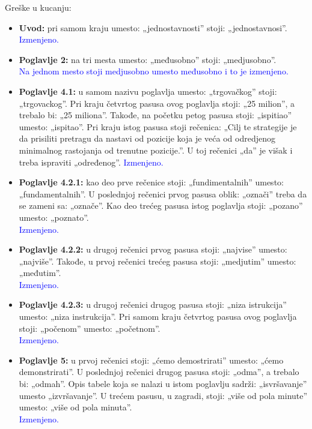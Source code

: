 \documentclass[a4paper]{report}
\newcommand{\odgovor}[1]{\textcolor{blue}{#1}}
\begin{document}
Greške u kucanju:
\begin{itemize}
 \item \textbf{Uvod:} pri samom kraju umesto: „jednostavnosti” stoji: „jednostavnosi”.
 \odgovor{Izmenjeno.\\}
 
 \item \textbf{Poglavlje 2:} na tri mesta umesto: „međusobno” stoji: „medjusobno”.\\
 \odgovor{Na jednom mesto stoji medjusobno umesto međusobno i to je izmenjeno.\\}
 
 \item \textbf{Poglavlje 4.1:} u samom nazivu poglavlja umesto: „trgovačkog” stoji: „trgovackog”. Pri kraju četvrtog pasusa ovog poglavlja stoji: „25 milion”, a trebalo bi: „25 miliona”. Takođe, na početku petog pasusa stoji: „ispitiao” umesto: „ispitao”. Pri kraju istog pasusa stoji rečenica: „Cilj te strategije je da prisiliti pretragu da nastavi od pozicije koja je veća od odredjenog minimalnog rastojanja od trenutne pozicije.”. U toj rečenici „da” je višak i treba ispraviti „određenog”.
 \odgovor{Izmenjeno.\\}
 \item \textbf{Poglavlje 4.2.1:} kao deo prve rečenice stoji: „fundimentalnih” umesto: „fundamentalnih”. U poslednjoj rečenici prvog pasusa oblik: „označi” treba da se zameni sa: „označe”. Kao deo trećeg pasusa istog poglavlja stoji: „pozano” umesto: „poznato”.\\
\odgovor{Izmenjeno.\\}
 
 \item \textbf{Poglavlje 4.2.2:} u drugoj rečenici prvog pasusa stoji: „najvise” umesto: „najviše”. Takođe, u prvoj rečenici trećeg pasusa stoji: „medjutim” umesto: „međutim”.\\
\odgovor{Izmenjeno.\\}
 
 \item \textbf{Poglavlje 4.2.3:} u drugoj rečenici drugog pasusa stoji: „niza istrukcija” umesto: „niza instrukcija”. Pri samom kraju četvrtog pasusa ovog poglavlja stoji: „počenom” umesto: „početnom”.\\
\odgovor{Izmenjeno.\\}
 
 \item \textbf{Poglavlje 5:} u prvoj rečenici stoji: „ćemo demostrirati” umesto: „ćemo demonstrirati”. U poslednjoj rečenici drugog pasusa stoji: „odma”, a trebalo bi: „odmah”. Opis tabele koja se nalazi u istom poglavlju sadrži: „isvršavanje” umesto „izvršavanje”. U trećem pasusu, u zagradi, stoji: „više od pola minute” umesto: „više od pola minuta”.\\
\odgovor{Izmenjeno.\\}
\end{itemize}
\end{document}
